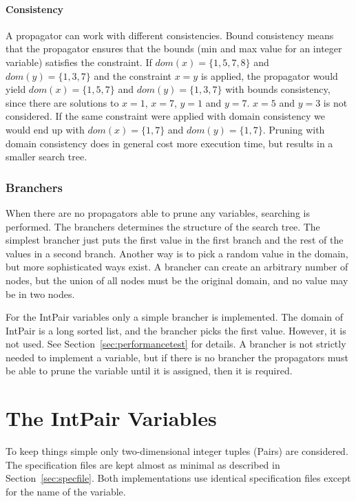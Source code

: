 \documentclass[a4paper,11pt]{article}
\begin{document}
\paragraph{Consistency}
A propagator can work with different consistencies. Bound consistency means that the propagator ensures that the bounds (min and max value for an integer variable) satisfies the constraint. If $dom(x)=\{1,5,7,8\}$ and $dom(y)=\{1,3,7\}$ and the constraint $x=y$ is applied, the propagator would yield $dom(x)=\{1,5,7\}$ and $dom(y)=\{1,3,7\}$ with bounds consistency, since there are solutions to $x=1$, $x=7$, $y=1$ and $y=7$. $x=5$ and $y=3$ is not considered. If the same constraint were applied with domain consistency we would end up with $dom(x)=\{1,7\}$ and $dom(y)=\{1,7\}$. Pruning with domain consistency does in general cost more execution time, but results in a smaller search tree.

\subsubsection{Branchers}
When there are no propagators able to prune any variables, searching is performed. The branchers determines the structure of the search tree. The simplest brancher just puts the first value in the first branch and the rest of the values in a second branch. Another way is to pick a random value in the domain, but more sophisticated ways exist. A brancher can create an arbitrary number of nodes, but the union of all nodes must be the original domain, and no value may be in two nodes.

For the IntPair variables only a simple brancher is implemented. The domain of IntPair is a long sorted list, and the brancher picks the first value. However, it is not used. See Section~\ref{sec:performancetest} for details. A brancher is not strictly needed to implement a variable, but if there is no brancher the propagators must be able to prune the variable until it is assigned, then it is required. 

\section{The IntPair Variables}
To keep things simple only two-dimensional integer tuples (Pairs) are considered. The specification files are kept almost as minimal as described in Section~\ref{sec:specfile}. Both implementations use identical specification files except for the name of the variable. 
\end{document}
